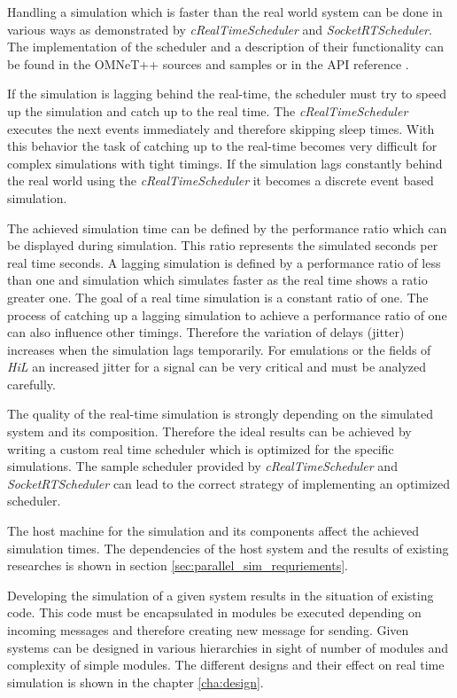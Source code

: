 Handling a simulation which is faster than the real world system can be done in various ways as demonstrated by \emph{cRealTimeScheduler} and \emph{SocketRTScheduler}.
The implementation of the scheduler and a description of their functionality can be found in the OMNeT++ sources and samples or in the API reference \cite{omnet_api}.

If the simulation is lagging behind the real-time, the scheduler must try to speed up the simulation and catch up to the real time.
The \emph{cRealTimeScheduler} executes the next events immediately and therefore skipping sleep times.
With this behavior the task of catching up to the real-time becomes very difficult for complex simulations with tight timings.
If the simulation lags constantly behind the real world using the \emph{cRealTimeScheduler} it becomes a discrete event based simulation.

The achieved simulation time can be defined by the performance ratio which can be displayed during simulation.
This ratio represents the simulated seconds per real time seconds.
A lagging simulation is defined by a performance ratio of less than one and simulation which simulates faster as the real time shows a ratio greater one.
The goal of a real time simulation is a constant ratio of one.
The process of catching up a lagging simulation to achieve a performance ratio of one can also influence other timings.
Therefore the variation of delays (jitter) increases when the simulation lags temporarily.
For emulations or the fields of \emph{HiL} an increased jitter for a signal can be very critical and must be analyzed carefully.

The quality of the real-time simulation is strongly depending on the simulated system and its composition.
Therefore the ideal results can be achieved by writing a custom real time scheduler which is optimized for the specific simulations.
The sample scheduler provided by \emph{cRealTimeScheduler} and \emph{SocketRTScheduler} can lead to the correct strategy of implementing an optimized scheduler.

The host machine for the simulation and its components affect the achieved simulation times.
The dependencies of the host system and the results of existing researches is shown in section \ref{sec:parallel_sim_requriements}.

Developing the simulation of a given system results in the situation of existing code.
This code must be encapsulated in modules be executed depending on incoming messages and therefore creating new message for sending.
Given systems can be designed in various hierarchies in sight of number of modules and complexity of simple modules.
The different designs and their effect on real time simulation is shown in the chapter \ref{cha:design}.

